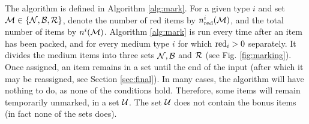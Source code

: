 The algorithm {\MarkItems} is defined in Algorithm \ref{alg:mark}. 
For a given type $i$ and set $\mathcal{M} \in \{\mathcal{N},\mathcal{B},\mathcal{R}\}$,
denote the number of red items by $n_{\mathrm{red}}^i(\mathcal{M})$,
and the total number of items by $n^i(\mathcal{M})$. 
Algorithm \ref{alg:mark} is run every time after an item has been packed, 
and for every medium type $i$ for which $\mathrm{red}_i>0$ separately.
It divides the medium items into three sets $\mathcal{N}, \mathcal{B}$ and $\mathcal{R}$ (see Fig. \ref{fig:marking}). 
Once assigned, an item remains in a set
until the end of the input (after which it may be reassigned, see Section \ref{sec:final}). In many cases, the algorithm will have nothing to do, as none of the conditions hold.
Therefore, some items will remain temporarily unmarked, in a set $\mathcal{U}$. 
The set $\mathcal{U}$ does not contain the bonus items (in fact none of the sets does).


